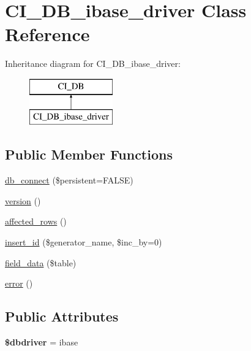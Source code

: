 \hypertarget{class_c_i___d_b__ibase__driver}{}\section{C\+I\+\_\+\+D\+B\+\_\+ibase\+\_\+driver Class Reference}
\label{class_c_i___d_b__ibase__driver}
Inheritance diagram for C\+I\+\_\+\+D\+B\+\_\+ibase\+\_\+driver\+:\begin{figure}[H]
\begin{center}
\leavevmode
\includegraphics[height=2.000000cm]{class_c_i___d_b__ibase__driver}
\end{center}
\end{figure}
\subsection*{Public Member Functions}
\begin{DoxyCompactItemize}
\item 
\mbox{\hyperlink{class_c_i___d_b__ibase__driver_a2158deef346899fc1bcaf3504eea920b}{db\+\_\+connect}} (\$persistent=F\+A\+L\+SE)
\item 
\mbox{\hyperlink{class_c_i___d_b__ibase__driver_a48daaaac4c8a75f012ea93f335d97864}{version}} ()
\item 
\mbox{\hyperlink{class_c_i___d_b__ibase__driver_ab72b8da27db62002f878eb0c80033b77}{affected\+\_\+rows}} ()
\item 
\mbox{\hyperlink{class_c_i___d_b__ibase__driver_aba89c5dedb6354530c8f2095f98325ba}{insert\+\_\+id}} (\$generator\+\_\+name, \$inc\+\_\+by=0)
\item 
\mbox{\hyperlink{class_c_i___d_b__ibase__driver_a6913279dbd58aae14b8cb201f738e917}{field\+\_\+data}} (\$table)
\item 
\mbox{\hyperlink{class_c_i___d_b__ibase__driver_aee3fd42c31a0a44ba04dcdf510a42fad}{error}} ()
\end{DoxyCompactItemize}
\subsection*{Public Attributes}
\begin{DoxyCompactItemize}
\item 
\mbox{\label{class_c_i___d_b__ibase__driver_a394ca1dc000c4cb12ece7e04ba315160}} 
{\bfseries \$dbdriver} = \textquotesingle{}ibase\textquotesingle{}
\end{DoxyCompactItemize}
